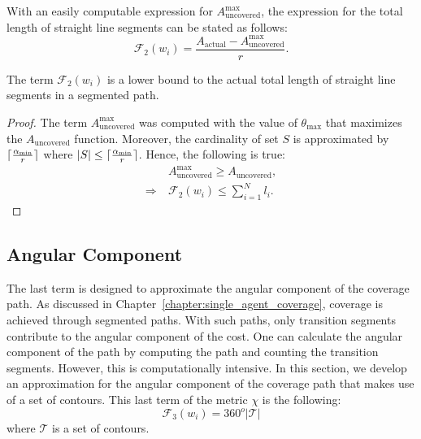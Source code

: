 \documentclass[../main.tex]{subfiles}
\begin{document}
With an easily computable expression for $A_{\text{uncovered}}^{\max}$, the expression for the total length of straight line segments can be stated as follows:
\begin{equation}
	\mathcal{F}_2(w_i)=\frac{A_{\text{actual}}-A_{\text{uncovered}}^{\max}}{r}.
\end{equation}

\begin{proposition}
The term $\mathcal{F}_2(w_i)$ is a lower bound to the actual total length of straight line segments in a segmented path.
\end{proposition}
\begin{proof}
The term $A_{\text{uncovered}}^{\max}$ was computed with the value of $\theta_{\max}$ that maximizes the $A_{\text{uncovered}}$ function. Moreover, the cardinality of set $S$ is approximated by $\lceil\frac{\alpha_{\min}}{r}\rceil$ where $|S|\leq\lceil\frac{\alpha_{\min}}{r}\rceil$. Hence, the following is true:
\begin{equation}
\begin{aligned}
	&A_{\text{uncovered}}^{\max}\geq A_{\text{uncovered}},\\
	\Longrightarrow\  &\mathcal{F}_2(w_i)\leq\sum_{i=1}^Nl_i.
	\end{aligned}
\end{equation}
\end{proof}



\subsection{Angular Component}
\label{subsection:angular_component}

The last term is designed to approximate the angular component of the coverage path. As discussed in Chapter~\ref{chapter:single_agent_coverage}, coverage is achieved through segmented paths. With such paths, only transition segments contribute to the angular component of the cost. One can calculate the angular component of the path by computing the path and counting the transition segments. However, this  is computationally intensive. In this section, we develop an approximation for the angular component of the coverage path that makes use of a set of contours. This last term of the metric $\chi$ is the following:
\begin{equation}
	\label{eq:f3}
	\mathcal{F}_3(w_i)=360^o|\mathcal{T}|
\end{equation}%
where $\mathcal{T}$ is a set of contours.
\end{document}
